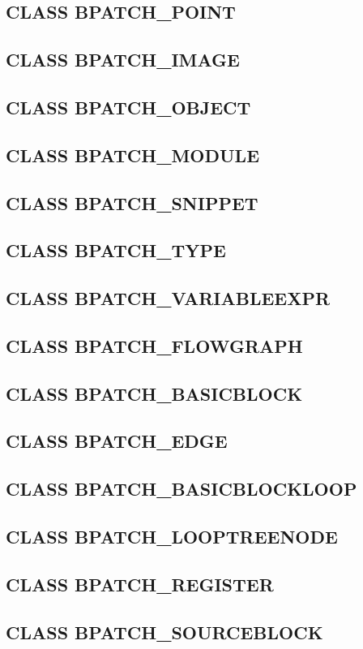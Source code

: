\documentclass[twopages,a4paper]{article}
\begin{document}
\subsection{CLASS BPATCH\_POINT}
\subsection{CLASS BPATCH\_IMAGE}
\subsection{CLASS BPATCH\_OBJECT}
\subsection{CLASS BPATCH\_MODULE}
\subsection{CLASS BPATCH\_SNIPPET}
\subsection{CLASS BPATCH\_TYPE}
\subsection{CLASS BPATCH\_VARIABLEEXPR}
\subsection{CLASS BPATCH\_FLOWGRAPH}
\subsection{CLASS BPATCH\_BASICBLOCK}
\subsection{CLASS BPATCH\_EDGE}
\subsection{CLASS BPATCH\_BASICBLOCKLOOP}
\subsection{CLASS BPATCH\_LOOPTREENODE}
\subsection{CLASS BPATCH\_REGISTER}
\subsection{CLASS BPATCH\_SOURCEBLOCK}
\end{document}
